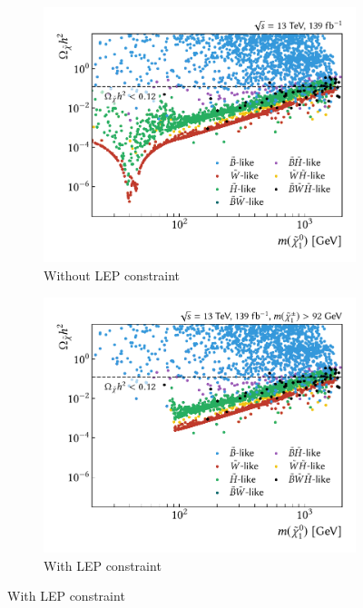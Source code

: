 \begin{figure}[h]
	\centering
	\begin{subfigure}[b]{0.49\linewidth}
		\centering\includegraphics[width=\textwidth]{scatter/relic_density_lsp}
		\caption{Without LEP constraint\label{fig:relic_density_lsp_no_constraint}}
	\end{subfigure}\hfill
	\begin{subfigure}[b]{0.49\linewidth}
		\centering\includegraphics[width=\textwidth]{scatter/relic_density_lsp_limits}
		\caption{With LEP constraint\label{fig:relic_density_lsp_constraint}}

\end{subfigure}
\end{figure}
